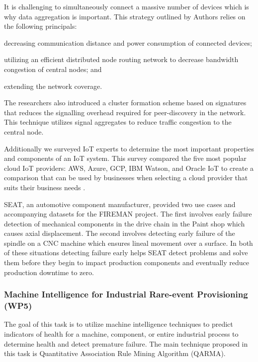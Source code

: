 It is challenging to simultaneously connect a massive number of devices which is why data aggregation is important.
This strategy outlined by Authors \cite{massive-machine} relies on the following principals:
\begin{inlinelist}
  \item decreasing communication distance and power consumption of connected devices;
  \item utilizing an efficient distributed node routing network to decrease bandwidth congestion of central nodes; and
  \item extending the network coverage.
\end{inlinelist}
The researchers also introduced a cluster formation scheme based on signatures that reduces the signalling overhead required for peer-discovery in the network. This technique utilizes signal aggregates to reduce traffic congestion to the central node.

Additionally we surveyed IoT experts to determine the most important properties and components of an IoT system. This survey compared the five most popular cloud IoT providers: AWS, Azure, GCP, IBM Watson, and Oracle IoT to create a comparison that can be used by businesses when selecting a cloud provider that suits their business needs \parencite{choose-iot-9110590}.

SEAT, an automotive component manufacturer, provided two use cases and accompanying datasets for the FIREMAN project. The first involves early failure detection of mechanical components in the drive chain in the Paint shop which causes axial displacement. The second involves detecting early failure of the spindle on a CNC machine which ensures lineal movement over a surface. In both of these situations detecting failure early helps SEAT detect problems and solve them before they begin to impact production components and eventually reduce production downtime to zero. 

\subsubsection{Machine Intelligence for Industrial Rare-event Provisioning (WP5)}

The goal of this task is to utilize machine intelligence techniques to predict indicators of health for a machine, component, or entire industrial process to determine health and detect premature failure. The main technique proposed in this task is Quantitative Association Rule Mining Algorithm (QARMA).

